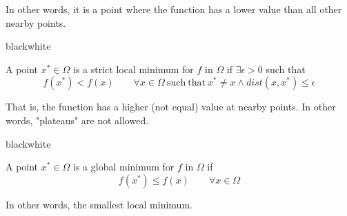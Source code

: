 In other words, it is a point where the function has a lower value than all other nearby points.

\begin{center}
\end{center}

\begin{remark}{black}{white}
    \begin{definition}
        A point \( x^* \in \Omega \) is a strict local minimum for \( f \) in \( \Omega \) if \( \exists \epsilon > 0 \) such that
        \[
            f(x^*) < f(x) \qquad \forall x \in \Omega \mathrm{~such~that~} x^* \neq x \land \mathit{dist}(x, x^*) \leq \epsilon
        \]
    \end{definition}
\end{remark}

That is, the function has a higher (not equal) value at nearby points. In other words, "plateaus" are not allowed.


\begin{remark}{black}{white}
    \begin{definition}
        A point \( x^* \in \Omega \) is a global minimum for \( f \) in \( \Omega \) if
        \[
            f(x^*) \leq f(x) \qquad \forall x \in \Omega
        \]
    \end{definition}
\end{remark}

In other words, the smallest local minimum.

